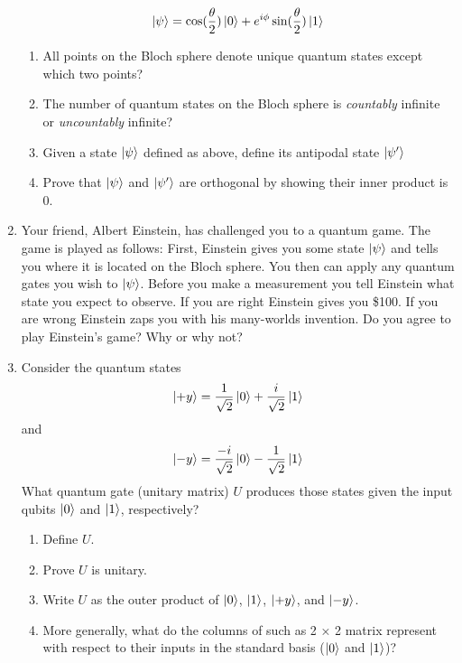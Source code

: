 \documentclass[12pt]{article}
\begin{document}
\begin{enumerate}[font=\bfseries]
    \[\ket{\psi} = \cos(\frac{\theta}{2})\ket{0}
    + e^{i\phi}\sin(\frac{\theta}{2})\ket{1}\]
    \begin{enumerate}
        \item All points on the Bloch sphere denote unique quantum states except which two points?
        \item The number of quantum states on the Bloch sphere is \emph{countably} infinite or \emph{uncountably} infinite?
        \item Given a state $\ket{\psi}$ defined as above, define its antipodal state $\ket{\psi'}$
        \item Prove that $\ket{\psi}$ and $\ket{\psi'}$ are orthogonal by showing their inner product is 0.
    \end{enumerate}
    \item Your friend, Albert Einstein, has challenged you to a quantum game. The game is played as follows: First, Einstein gives you some state $\ket{\psi}$ and tells you where it is located on the Bloch sphere. You then can apply any quantum gates you wish to $\ket{\psi}$. Before you make a measurement you tell Einstein what state you expect to observe. If you are right Einstein gives you \$100. If you are wrong Einstein zaps you with his many-worlds invention. Do you agree to play Einstein's game? Why or why not?
    \item Consider the quantum states
        \[\ket{+y} = \frac{1}{\sqrt{2}}\ket{0} + \frac{i}{\sqrt{2}}\ket{1}\]
        and
        \[\ket{-y} = \frac{-i}{\sqrt{2}}\ket{0} - \frac{1}{\sqrt{2}}\ket{1}\]
        What quantum gate (unitary matrix) $U$ produces those states given the input qubits $\ket{0}$ and $\ket{1}$, respectively?
        \begin{enumerate}
            \item Define $U$.
            \item Prove $U$ is unitary.
            \item Write $U$ as the outer product of $\ket{0}$, $\ket{1}$, $\ket{+y}$, and $\ket{-y}$.
            \item More generally, what do the columns of such as 2 × 2 matrix represent with respect to their inputs in the standard basis ($\ket{0}$ and $\ket{1}$)?
        \end{enumerate}
\end{enumerate}
\end{document}

